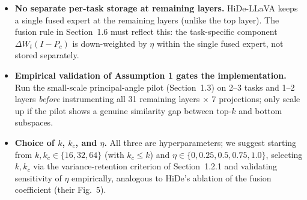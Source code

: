 \documentclass[a4paper]{article}
\begin{document}
\begin{itemize}
\item \textbf{No separate per-task storage at remaining layers.} HiDe-LLaVA keeps a single fused expert at the remaining layers (unlike the top layer). The fusion rule in Section~1.6 must reflect this: the task-specific component $\Delta W_t(I-P_c)$ is down-weighted by $\eta$ within the single fused expert, not stored separately.
\item \textbf{Empirical validation of Assumption 1 gates the implementation.} Run the small-scale principal-angle pilot (Section~1.3) on 2--3 tasks and 1--2 layers \emph{before} instrumenting all 31 remaining layers $\times$ 7 projections; only scale up if the pilot shows a genuine similarity gap between top-$k$ and bottom subspaces.
\item \textbf{Choice of $k$, $k_c$, and $\eta$.} All three are hyperparameters; we suggest starting from $k,k_c\in\{16,32,64\}$ (with $k_c\le k$) and $\eta\in\{0,0.25,0.5,0.75,1.0\}$, selecting $k,k_c$ via the variance-retention criterion of Section~1.2.1 and validating sensitivity of $\eta$ empirically, analogous to HiDe's ablation of the fusion coefficient (their Fig.~5).
\end{itemize}
\end{document}

